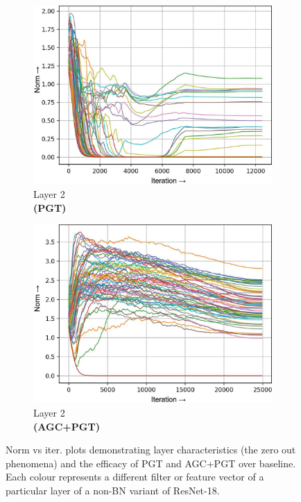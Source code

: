 \documentclass[runningheads]{llncs}
\begin{document}
\begin{figure}[t]
\begin{subfigure}[t]{0.16\textwidth}
\includegraphics[width=\textwidth]{trimmed/pgt-w-layer-1-2}
\caption{Layer 2\\ \textbf{(PGT)}
}\end{subfigure}
\begin{subfigure}[t]{0.16\textwidth}
\includegraphics[width=\textwidth]{trimmed/agc_pgt-w-layer-1-2}
\caption{Layer 2\\ \textbf{(AGC+PGT)}}
\end{subfigure}
\captionsetup{font=normalsize}
\caption{ Norm vs iter. plots demonstrating layer characteristics (the zero out
phenomena) and the efficacy of PGT and AGC+PGT over baseline. Each colour represents a
different filter or feature vector of a particular layer of a non-BN variant of
ResNet-18. }
\label{fig:norm_plots}
\vspace{-0.5cm}
\end{figure}
\end{document}
